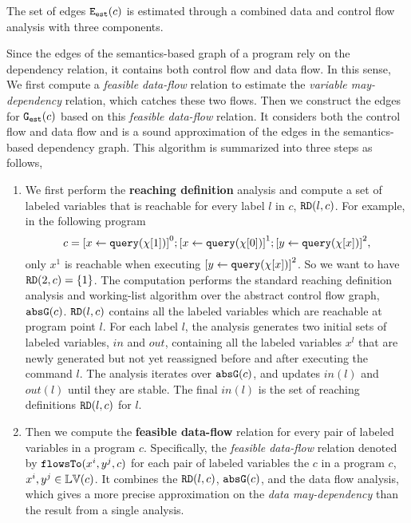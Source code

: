 The set of edges $\mathtt{{E_{est}}}(c)$ is estimated through a combined data and control flow analysis with three components.

Since the edges of the semantics-based graph of a program rely on the dependency relation, it contains both control flow and data flow. 
In this sense, We first compute a \emph{feasible data-flow} relation to estimate the \emph{variable may-dependency} relation, which catches these two flows.
Then we construct the edges for $\mathtt{{G_{est}}}(c)$ based on this \emph{feasible data-flow} relation.
It 
considers both the control flow and data flow and
is a sound approximation of the edges in the semantics-based dependency graph.
This algorithm is summarized into three steps as follows,
\begin{enumerate}
 \item 
 We first perform the \textbf{reaching definition} analysis and compute a set of labeled variables that is reachable for every label $l$ in $c$, $\mathtt{RD}(l, c)$.
 For example, in the following program
 \[
 c = \clabel{\assign{x}{\query(\chi[1])}}^0 ;\clabel{\assign{x}{\query(\chi[0])}}^1 ;
 \clabel{\assign{y}{\query(\chi[x])}}^2,
 \]
 only $x^1$ is reachable when executing $\clabel{\assign{y}{\query(\chi[x])}}^2$.
 So we want to have $\mathtt{RD}(2, c) = \{1\}$.
The computation performs the standard reaching definition analysis and working-list algorithm over the abstract control flow graph, $\mathtt{abs}{\mathtt{G}}(c)$. 
 $\mathtt{RD}(l, c)$ contains all the labeled variables which are reachable at program point $l$. 
 For each label $l$, the analysis generates two initial sets of labeled variables, $in$ and $out$, 
 containing all the labeled variables $x^l$ that are newly generated but not yet reassigned before and after executing the command $l$.
 The analysis iterates over $\mathtt{abs}{\mathtt{G}}(c)$, and updates $in(l)$ and $out(l)$ until they are stable.
 The final $in(l)$ is the set of reaching definitions $\mathtt{RD}(l, c)$ for $l$. 
 \item 
 Then we compute the \textbf{feasible data-flow} relation
 for every pair of labeled variables in a program $c$.
 Specifically, the \emph{feasible data-flow} relation denoted by
 $\mathtt{flowsTo}(x^i, y^j, c)$ for each pair of labeled variables the $c$ in a program $c$, $x^i, y^j \in \mathbb{LV}(c)$.
 It combines the $\mathtt{RD}(l, c)$, $\mathtt{abs}{\mathtt{G}}(c)$, and the data flow analysis, which gives a more precise approximation on the \emph{data may-dependency} than the result from a single analysis.

\end{enumerate}
